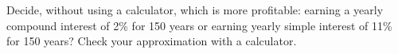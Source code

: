 \begin{frame}
\begin{example}
Decide, without using a calculator, which is more profitable: earning a yearly compound interest of 2\% for 150 years or earning yearly simple interest of 11\% for 150 years? Check your approximation with a calculator.

\end{example}
\end{frame}
